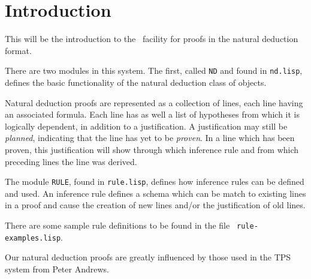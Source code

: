 \section{Introduction}

This will be the introduction to the \keim\  facility for proofs in the 
natural deduction format.

There are two modules in this system.  The first, called {\tt ND} and found in 
{\tt nd.lisp}, defines the basic functionality of the natural deduction
class of objects.   

Natural deduction proofs are represented as a collection of lines, each line
having an associated formula.  Each line has as well a list of hypotheses
from which it is logically dependent, in addition to a justification. 
A justification may still be {\em planned\/}, indicating that
the line has yet to be {\em proven}.  In a line which has been proven,
this justification will show through which inference rule and from which
preceding lines the line was derived.

The module {\tt RULE}, found in {\tt rule.lisp}, defines how inference rules
can be defined and used.  An inference rule defines a schema which can be
match to existing lines in a proof and cause the creation of new lines
and/or the justification of old lines. 

There are some sample rule definitions to be found in the file {\tt
rule-examples.lisp}.

Our natural deduction proofs are greatly influenced by those used in the
TPS system from Peter Andrews. 


